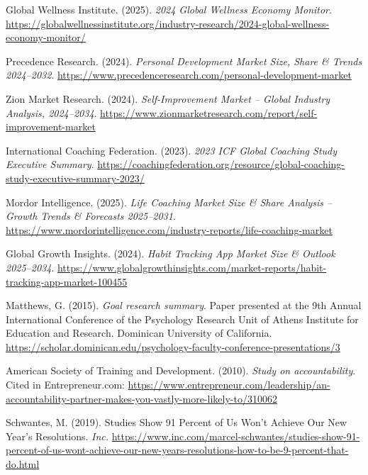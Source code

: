 \documentclass[11pt,a4paper]{article}
\begin{document}
\begin{enumerate}[label={[\arabic*]}, leftmargin=*, itemsep=2pt]

  \item Global Wellness Institute. (2025). \textit{2024 Global Wellness Economy Monitor}. \url{https://globalwellnessinstitute.org/industry-research/2024-global-wellness-economy-monitor/}

  \item Precedence Research. (2024). \textit{Personal Development Market Size, Share \& Trends 2024--2032}. \url{https://www.precedenceresearch.com/personal-development-market}

  \item Zion Market Research. (2024). \textit{Self-Improvement Market -- Global Industry Analysis, 2024--2034}. \url{https://www.zionmarketresearch.com/report/self-improvement-market}

  \item International Coaching Federation. (2023). \textit{2023 ICF Global Coaching Study Executive Summary}. \url{https://coachingfederation.org/resource/global-coaching-study-executive-summary-2023/}

  \item Mordor Intelligence. (2025). \textit{Life Coaching Market Size \& Share Analysis -- Growth Trends \& Forecasts 2025--2031}. \url{https://www.mordorintelligence.com/industry-reports/life-coaching-market}

  \item Global Growth Insights. (2024). \textit{Habit Tracking App Market Size \& Outlook 2025--2034}. \url{https://www.globalgrowthinsights.com/market-reports/habit-tracking-app-market-100455}

  \item Matthews, G. (2015). \textit{Goal research summary}. Paper presented at the 9th Annual International Conference of the Psychology Research Unit of Athens Institute for Education and Research. Dominican University of California. \url{https://scholar.dominican.edu/psychology-faculty-conference-presentations/3}

  \item American Society of Training and Development. (2010). \textit{Study on accountability}. Cited in Entrepreneur.com: \url{https://www.entrepreneur.com/leadership/an-accountability-partner-makes-you-vastly-more-likely-to/310062}

  \item Schwantes, M. (2019). Studies Show 91 Percent of Us Won't Achieve Our New Year's Resolutions. \textit{Inc.} \url{https://www.inc.com/marcel-schwantes/studies-show-91-percent-of-us-wont-achieve-our-new-years-resolutions-how-to-be-9-percent-that-do.html}


\end{enumerate}
\end{document}
